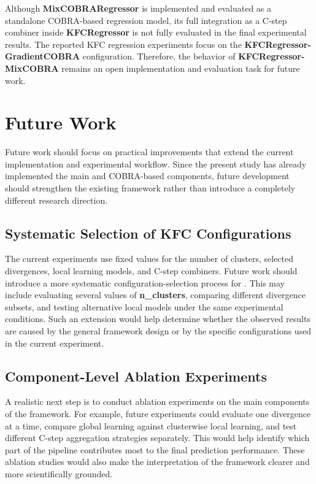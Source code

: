 \hs Although \textbf{MixCOBRARegressor} is implemented and evaluated as a standalone COBRA-based regression model, its full integration as a C-step combiner inside \textbf{KFCRegressor} is not fully evaluated in the final experimental results. The reported KFC regression experiments focus on the \textbf{KFCRegressor-GradientCOBRA} configuration. Therefore, the behavior of \textbf{KFCRegressor-MixCOBRA} remains an open implementation and evaluation task for future work.

\section{Future Work}
\label{sec:future_work}

\hs Future work should focus on practical improvements that extend the current implementation and experimental workflow. Since the present study has already implemented the main \KFCProcedure{} and COBRA-based components, future development should strengthen the existing framework rather than introduce a completely different research direction.

\subsection{Systematic Selection of KFC Configurations}

\hs The current experiments use fixed values for the number of clusters, selected divergences, local learning models, and C-step combiners. Future work should introduce a more systematic configuration-selection process for \KFCProcedure{}. This may include evaluating several values of \textbf{n\_clusters}, comparing different divergence subsets, and testing alternative local models under the same experimental conditions. Such an extension would help determine whether the observed results are caused by the general framework design or by the specific configurations used in the current experiment.

\subsection{Component-Level Ablation Experiments}

\hs A realistic next step is to conduct ablation experiments on the main components of the framework. For example, future experiments could evaluate one divergence at a time, compare global learning against clusterwise local learning, and test different C-step aggregation strategies separately. This would help identify which part of the \KFCProcedure{} pipeline contributes most to the final prediction performance. These ablation studies would also make the interpretation of the framework clearer and more scientifically grounded.

